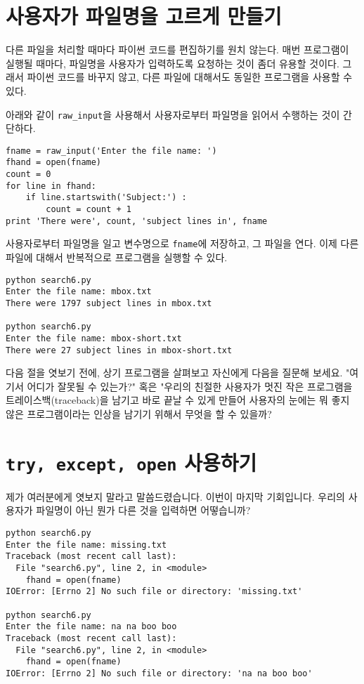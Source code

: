 \section{사용자가 파일명을 고르게 만들기}

다른 파일을 처리할 때마다 파이썬 코드를 편집하기를 원치 않는다. 매번 프로그램이 실행될 때마다, 파일명을 사용자가 입력하도록 요청하는 것이 좀더 유용할 것이다. 
그래서 파이썬 코드를 바꾸지 않고, 다른 파일에 대해서도 동일한 프로그램을 사용할 수 있다.

아래와 같이 \verb"raw_input"을 사용해서 사용자로부터 파일명을 읽어서 수행하는 것이 간단하다.

\beforeverb
\begin{verbatim}
fname = raw_input('Enter the file name: ')
fhand = open(fname)
count = 0
for line in fhand:
    if line.startswith('Subject:') :
        count = count + 1
print 'There were', count, 'subject lines in', fname
\end{verbatim}
\afterverb
%

사용자로부터 파일명을 일고 변수명으로 {\tt fname}에 저장하고, 그 파일을 연다. 이제 다른 파일에 대해서 반복적으로 프로그램을 실행할 수 있다.

\beforeverb
\begin{verbatim}
python search6.py 
Enter the file name: mbox.txt
There were 1797 subject lines in mbox.txt

python search6.py 
Enter the file name: mbox-short.txt
There were 27 subject lines in mbox-short.txt
\end{verbatim}
\afterverb
%

다음 절을 엿보기 전에, 상기 프로그램을 살펴보고 자신에게 다음을 질문해 보세요.
"여기서 어디가 잘못될 수 있는가?" 혹은 "우리의 친절한 사용자가 멋진 작은 프로그램을 트레이스백(traceback)을 남기고 
바로 끝날 수 있게 만들어 사용자의 눈에는 뭐 좋지 않은 프로그램이라는 인상을 남기기 위해서 무엇을 할 수 있을까?


\section{{\tt try, except, open} 사용하기}

제가 여러분에게 엿보지 말라고 말씀드렸습니다. 이번이 마지막 기회입니다.
우리의 사용자가 파일명이 아닌 뭔가 다른 것을 입력하면 어떻습니까?

\beforeverb
\begin{verbatim}
python search6.py 
Enter the file name: missing.txt
Traceback (most recent call last):
  File "search6.py", line 2, in <module>
    fhand = open(fname)
IOError: [Errno 2] No such file or directory: 'missing.txt'

python search6.py 
Enter the file name: na na boo boo
Traceback (most recent call last):
  File "search6.py", line 2, in <module>
    fhand = open(fname)
IOError: [Errno 2] No such file or directory: 'na na boo boo'
\end{verbatim}
\afterverb
%

